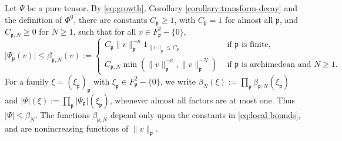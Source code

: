 \documentclass[reqno]{amsart}
\theoremstyle{plain}
\theoremstyle{definition}
\theoremstyle{itplain}
\numberwithin{equation}{section}
\numberwithin{theorem}{section}
\begin{document}
Let $\Psi$ be a pure tensor.  By \eqref{eq:growth}, Corollary \ref{corollary:transform-decay} and the definition of $\Phi^0$, there are constants $C_{\mathfrak{p}} \geq 1$, with $C_{\mathfrak{p}} = 1$ for almost all $\mathfrak{p}$, and $C_{\mathfrak{p}, N} \geq 0$ for $N \geq 1$, such that for all $v \in F_{\mathfrak{p}}^2 - \{0\}$,
\begin{equation}\label{eq:local-bounds}
  \lvert \Psi_{\mathfrak{p}}(v) \rvert \leq
  \beta_{\mathfrak{p}, N}(v) :=
  \begin{cases}
    C_{\mathfrak{p}} \lVert v \rVert_{\mathfrak{p}}^{-\kappa} 1_{\lVert v \rVert_{\mathfrak{p}} \leq C_{\mathfrak{p}}}
    & \text{ if $\mathfrak{p}$ is finite,} \\
    C_{\mathfrak{p}, N} \min ( \lVert v \rVert_{\mathfrak{p}}^{-\kappa}, \lVert v \rVert_{\mathfrak{p}}^{-N} )
    & \text{ if $\mathfrak{p}$ is archimedean and $N \geq 1$.}
  \end{cases}
\end{equation}
For a family $\xi = (\xi_{\mathfrak{p}})_{\mathfrak{p}}$ with $\xi_{\mathfrak{p}} \in F_{\mathfrak{p}}^2 - \{0\}$, we write $\beta_N(\xi) := \prod_{\mathfrak{p}} \beta_{\mathfrak{p}, N}(\xi_{\mathfrak{p}})$ and $\lvert \Psi \rvert(\xi) := \prod_{\mathfrak{p}} \lvert \Psi_{\mathfrak{p}} \rvert(\xi_{\mathfrak{p}})$, whenever almost all factors are at most one.  Thus $\lvert \Psi \rvert \leq \beta_N$.  The functions $\beta_{\mathfrak{p}, N}$ depend only upon the constants in \eqref{eq:local-bounds}, and are nonincreasing functions of $\lVert v \rVert_{\mathfrak{p}}$.
\end{document}
